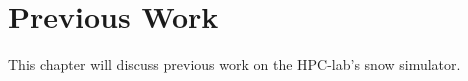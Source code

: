 \chapter{Previous Work}
\label{chap:prevwork}

This chapter will discuss previous work on the HPC-lab's snow simulator.


